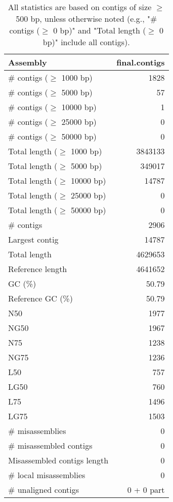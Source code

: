 \documentclass[12pt,a4paper]{article}
\begin{document}
\begin{table}[ht]
\begin{center}
\caption{All statistics are based on contigs of size $\geq$ 500 bp, unless otherwise noted (e.g., "\# contigs ($\geq$ 0 bp)" and "Total length ($\geq$ 0 bp)" include all contigs).}
\begin{tabular}{|l*{1}{|r}|}
\hline
Assembly & final.contigs \\ \hline
\# contigs ($\geq$ 1000 bp) & 1828 \\ \hline
\# contigs ($\geq$ 5000 bp) & 57 \\ \hline
\# contigs ($\geq$ 10000 bp) & 1 \\ \hline
\# contigs ($\geq$ 25000 bp) & 0 \\ \hline
\# contigs ($\geq$ 50000 bp) & 0 \\ \hline
Total length ($\geq$ 1000 bp) & 3843133 \\ \hline
Total length ($\geq$ 5000 bp) & 349017 \\ \hline
Total length ($\geq$ 10000 bp) & 14787 \\ \hline
Total length ($\geq$ 25000 bp) & 0 \\ \hline
Total length ($\geq$ 50000 bp) & 0 \\ \hline
\# contigs & 2906 \\ \hline
Largest contig & 14787 \\ \hline
Total length & 4629653 \\ \hline
Reference length & 4641652 \\ \hline
GC (\%) & 50.79 \\ \hline
Reference GC (\%) & 50.79 \\ \hline
N50 & 1977 \\ \hline
NG50 & 1967 \\ \hline
N75 & 1238 \\ \hline
NG75 & 1236 \\ \hline
L50 & 757 \\ \hline
LG50 & 760 \\ \hline
L75 & 1496 \\ \hline
LG75 & 1503 \\ \hline
\# misassemblies & 0 \\ \hline
\# misassembled contigs & 0 \\ \hline
Misassembled contigs length & 0 \\ \hline
\# local misassemblies & 0 \\ \hline
\# unaligned contigs & 0 + 0 part \\ \hline

\end{tabular}
\end{center}
\end{table}
\end{document}
